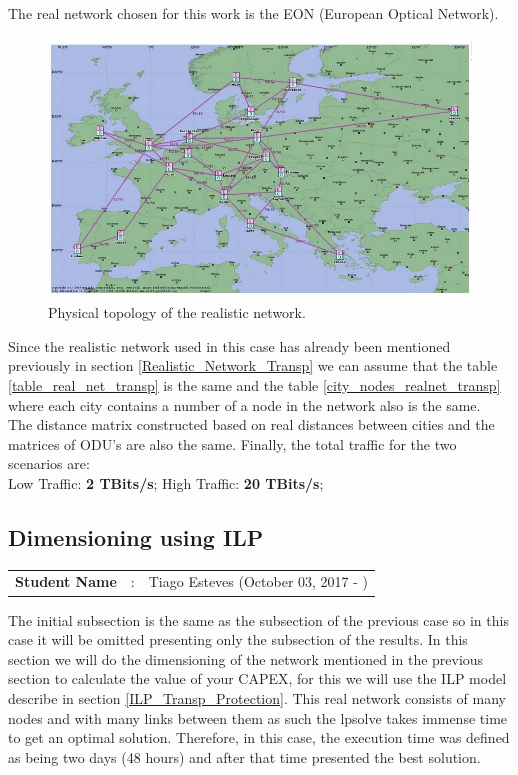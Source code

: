 The real network chosen for this work is the EON (European Optical Network).

\begin{figure}[h!]
\centering
\includegraphics[width=\textwidth]{sdf/transparent/figures/EON_Rede_Realista}
\caption{Physical topology of the realistic network.}
\end{figure}

Since the realistic network used in this case has already been mentioned previously in section \ref{Realistic_Network_Transp} we can assume that the table \ref{table_real_net_transp} is the same and the table \ref{city_nodes_realnet_transp} where each city contains a number of a node in the network also is the same.\\
The distance matrix constructed based on real distances between cities and the matrices of ODU's are also the same.
Finally, the total traffic for the two scenarios are:\\
Low Traffic: \textbf{2 TBits/s}; \quad High Traffic: \textbf{20 TBits/s};\\

\subsection{Dimensioning using ILP}
\begin{tcolorbox}	
\begin{tabular}{p{2.75cm} p{0.2cm} p{10.5cm}} 	
\textbf{Student Name}  &:& Tiago Esteves    (October 03, 2017 - )\\
\end{tabular}
\end{tcolorbox}

The initial subsection is the same as the subsection of the previous case so in this case it will be omitted presenting only the subsection of the results.
In this section we will do the dimensioning of the network mentioned in the previous section to calculate the value of your CAPEX, for this we will use the ILP model describe in section \ref{ILP_Transp_Protection}.
This real network consists of many nodes and with many links between them as such the lpsolve takes immense time to get an optimal solution. Therefore, in this case, the execution time was defined as being two days (48 hours) and after that time presented the best solution.\\

